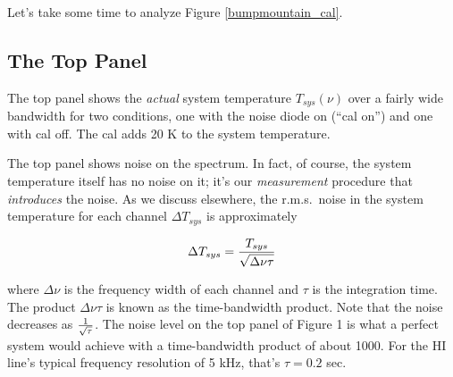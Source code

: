 \documentclass[preprint]{aastex}
\begin{document}
	Let's take some time to analyze Figure \ref{bumpmountain_cal}.

\subsection{The Top Panel}

	The top panel shows the {\it actual} system temperature
$T_{sys}(\nu)$ over a fairly wide bandwidth for two conditions, one with
the noise diode on (``cal on'') and one with cal off. The cal adds 20 K
to the system temperature.

	The top panel shows noise on the spectrum. In fact, of course,
the system temperature itself has no noise on it; it's our {\it
measurement} procedure that {\it introduces} the noise. As we discuss
elsewhere, the r.m.s.\ noise in the system temperature for each channel
$\Delta T_{sys}$ is approximately

\begin{equation}
\Delta T_{sys} = { T_{sys} \over \sqrt{ \Delta \nu \tau}}
\end{equation}

\noindent where $\Delta \nu$ is the frequency width of each channel and
$\tau$ is the integration time. The product $\Delta \nu \tau$ is known
as the time-bandwidth product. Note that the noise decreases as $1 \over
\sqrt{\tau}$. The noise level on the top panel of Figure 1 is what a
perfect system would achieve with a time-bandwidth product of about
1000. For the HI line's typical frequency resolution of 5 kHz, that's
$\tau = 0.2$ sec. 
\end{document}
